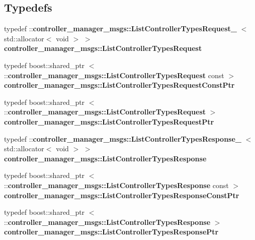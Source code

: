 \subsection*{\-Typedefs}
\begin{DoxyCompactItemize}
\item 
typedef \*
\-::{\bf controller\-\_\-manager\-\_\-msgs\-::\-List\-Controller\-Types\-Request\-\_\-}\*
$<$ std\-::allocator$<$ void $>$ $>$ {\bf controller\-\_\-manager\-\_\-msgs\-::\-List\-Controller\-Types\-Request}
\item 
typedef boost\-::shared\-\_\-ptr\*
$<$ \-::{\bf controller\-\_\-manager\-\_\-msgs\-::\-List\-Controller\-Types\-Request} \*
const  $>$ {\bf controller\-\_\-manager\-\_\-msgs\-::\-List\-Controller\-Types\-Request\-Const\-Ptr}
\item 
typedef boost\-::shared\-\_\-ptr\*
$<$ \-::{\bf controller\-\_\-manager\-\_\-msgs\-::\-List\-Controller\-Types\-Request} $>$ {\bf controller\-\_\-manager\-\_\-msgs\-::\-List\-Controller\-Types\-Request\-Ptr}
\item 
typedef \*
\-::{\bf controller\-\_\-manager\-\_\-msgs\-::\-List\-Controller\-Types\-Response\-\_\-}\*
$<$ std\-::allocator$<$ void $>$ $>$ {\bf controller\-\_\-manager\-\_\-msgs\-::\-List\-Controller\-Types\-Response}
\item 
typedef boost\-::shared\-\_\-ptr\*
$<$ \-::{\bf controller\-\_\-manager\-\_\-msgs\-::\-List\-Controller\-Types\-Response} \*
const  $>$ {\bf controller\-\_\-manager\-\_\-msgs\-::\-List\-Controller\-Types\-Response\-Const\-Ptr}
\item 
typedef boost\-::shared\-\_\-ptr\*
$<$ \-::{\bf controller\-\_\-manager\-\_\-msgs\-::\-List\-Controller\-Types\-Response} $>$ {\bf controller\-\_\-manager\-\_\-msgs\-::\-List\-Controller\-Types\-Response\-Ptr}
\end{DoxyCompactItemize}
